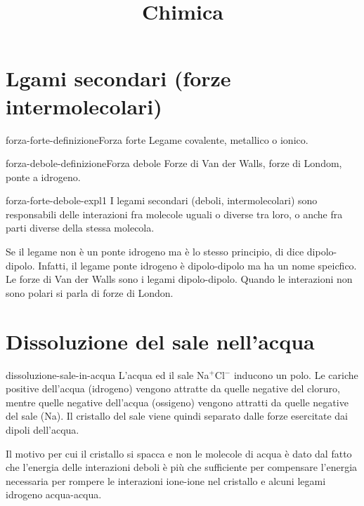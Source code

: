 \documentclass[preview]{standalone}
\begin{document}
\title{Chimica}
\genpage

\section{Lgami secondari (forze intermolecolari)}

\begin{snippetdefinition}{forza-forte-definizione}{Forza forte}
    Legame covalente, metallico o ionico.
\end{snippetdefinition}

\begin{snippetdefinition}{forza-debole-definizione}{Forza debole}
    Forze di Van der Walls, forze di Londom, ponte a idrogeno.
\end{snippetdefinition}

\begin{snippet}{forza-forte-debole-expl1}
    I legami secondari (deboli, intermolecolari) sono responsabili delle interazioni fra molecole uguali o diverse tra loro,
    o anche fra parti diverse della stessa molecola.

    Se il legame non è un ponte idrogeno ma è lo stesso principio, di dice dipolo-dipolo.
    Infatti, il legame ponte idrogeno è dipolo-dipolo ma ha un nome speicfico.
    Le forze di Van der Walls sono i legami dipolo-dipolo.
    Quando le interazioni non sono polari si parla di forze di London.
\end{snippet}

\section{Dissoluzione del sale nell'acqua}

\begin{snippet}{dissoluzione-sale-in-acqua}
L'acqua ed il sale Na\(^{+}\)Cl\(^{-}\) inducono un polo.
Le cariche positive dell'acqua (idrogeno) vengono attratte da quelle negative
del cloruro, mentre quelle negative dell'acqua (ossigeno)
vengono attratti da quelle negative del sale (Na).
Il cristallo del sale viene quindi separato dalle forze
esercitate dai dipoli dell'acqua.

Il motivo per cui il cristallo si spacca e non le molecole di acqua
è dato dal fatto che l'energia delle interazioni deboli è più che sufficiente
per compensare l'energia necessaria per rompere le interazioni ione-ione
nel cristallo e alcuni legami idrogeno acqua-acqua.
\end{snippet}
\end{document}
